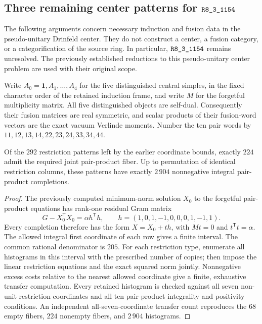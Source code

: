 \subsection{Three remaining center patterns for \texorpdfstring{$\sha{R8_3_1154}$}{R8-3-1154}}
\label{sec:r1154-three-center-patterns}

The following arguments concern necessary induction and fusion data in the
pseudo-unitary Drinfeld center.  They do not construct a center, a fusion
category, or a categorification of the source ring.  In particular,
$\sha{R8_3_1154}$ remains unresolved.  The previously established reductions to
this pseudo-unitary center problem are used with their original scope.

Write $A_0=\mathbf1,A_1,\ldots,A_4$ for the five distinguished central
simples, in the fixed character order of the retained induction frame, and
write $M$ for the forgetful multiplicity matrix.  All five distinguished
objects are self-dual.  Consequently their fusion matrices are real
symmetric, and scalar products of their fusion-word vectors are the exact
vacuum Verlinde moments.  Number the ten pair words by
$11,12,13,14,22,23,24,33,34,44$.

\begin{proposition}
Of the $292$ restriction patterns left by the earlier coordinate bounds,
exactly $224$ admit the required joint pair-product fiber.  Up to permutation
of identical restriction columns, these patterns have exactly $2\,904$
nonnegative integral pair-product completions.
\end{proposition}
\begin{proof}
The previously computed minimum-norm solution $X_0$ to the forgetful
pair-product equations has rank-one residual Gram matrix
\[
 G-X_0^{\mathsf T}X_0=\alpha h^{\mathsf T}h,
 \qquad h=(1,0,1,-1,0,0,0,1,-1,1).
\]
Every completion therefore has the form $X=X_0+t h$, with
$Mt=0$ and $t^{\mathsf T}t=\alpha$.  The allowed integral first coordinate
of each row gives a finite interval.  The common rational denominator is
$205$.  For each restriction type, enumerate all histograms in this
interval with the prescribed number of copies; then impose the linear
restriction equations and the exact squared norm jointly.  Nonnegative
excess costs relative to the nearest allowed coordinate give a finite,
exhaustive transfer computation.  Every retained histogram is checked
against all seven non-unit restriction coordinates and all ten
pair-product integrality and positivity conditions.  An independent
all-seven-coordinate transfer count reproduces the $68$ empty fibers,
$224$ nonempty fibers, and $2\,904$ histograms.
\end{proof}

